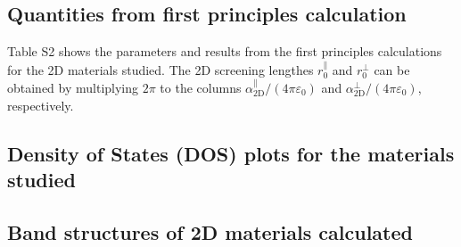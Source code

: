 \documentclass[manuscript=suppinfo,email=true,hyperref=true,keywords=false]{achemso}
\begin{document}
\subsection{Quantities from first principles calculation}

Table S2 shows the parameters and results from the
first principles calculations for the 2D materials studied. The 2D
screening lengthes $r_{0}^{\parallel}$ and $r_{0}^{\perp}$ can be
obtained by multiplying $2 \pi$ to the columns
$\alpha_{\mathrm{2D}}^{\parallel}/(4\pi \varepsilon_{0})$ and
$\alpha_{\mathrm{2D}}^{\perp}/(4\pi \varepsilon_{0})$, respectively.



\subsection{Density of States (DOS) plots for the materials studied}
\label{sec:DOS}




\subsection{Band structures of 2D materials calculated}
\label{sec:bs}




\clearpage{}
\section*{}
\label{sec:ref}

\end{document}
